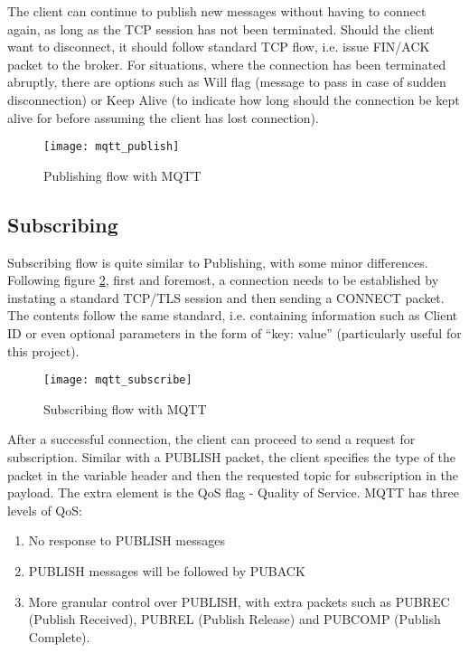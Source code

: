 The client can continue to publish new messages without having to connect again, as long as the TCP session has not been terminated. Should the client want to disconnect, it should follow standard TCP flow, i.e. issue FIN/ACK packet to the broker. For situations, where the connection has been terminated abruptly, there are options such as Will flag (message to pass in case of sudden disconnection) or Keep Alive (to indicate how long should the connection be kept alive for before assuming the client has lost connection).

\begin{figure}[ht]
    \centering
    \texttt{[image: mqtt\_publish]}
    \caption{Publishing flow with MQTT}
    \label{fig:mqtt_publish}
\end{figure}


\subsection{Subscribing}

Subscribing flow is quite similar to Publishing, with some minor differences. Following figure \ref{fig:mqtt_subscribe}, first and foremost, a connection needs to be established by instating a standard TCP/TLS session and then sending a CONNECT packet. The contents follow the same standard, i.e. containing information such as Client ID or even optional parameters in the form of ``key: value'' (particularly useful for this project).

\begin{figure}[ht]
    \centering
    \texttt{[image: mqtt\_subscribe]}
    \caption{Subscribing flow with MQTT}
    \label{fig:mqtt_subscribe}
\end{figure}

After a successful connection, the client can proceed to send a request for subscription. Similar with a PUBLISH packet, the client specifies the type of the packet in the variable header and then the requested topic for subscription in the payload. The extra element is the QoS flag - Quality of Service. MQTT has three levels of QoS:
\begin{enumerate}\addtocounter{enumi}{-1}
  \item No response to PUBLISH messages
  \item PUBLISH messages will be followed by PUBACK
  \item More granular control over PUBLISH, with extra packets such as PUBREC (Publish Received), PUBREL (Publish Release) and PUBCOMP (Publish Complete).
\end{enumerate}

